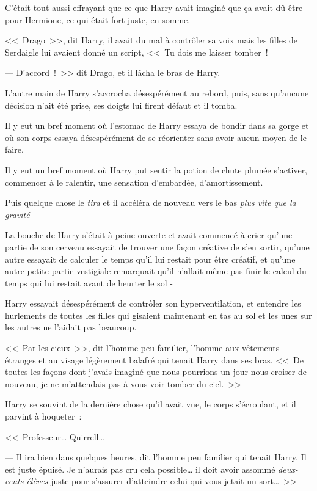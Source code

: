 C'était tout aussi effrayant que ce que Harry avait imaginé que ça avait dû être pour Hermione, ce qui était fort juste, en somme.

<<~Drago~>>, dit Harry, il avait du mal à contrôler sa voix mais les filles de Serdaigle lui avaient donné un script, <<~Tu dois me laisser tomber~!

--- D'accord~!~>> dit Drago, et il lâcha le bras de Harry.

L'autre main de Harry s'accrocha désespérément au rebord, puis, sans qu'aucune décision n'ait été prise, ses doigts lui firent défaut et il tomba.

Il y eut un bref moment où l'estomac de Harry essaya de bondir dans sa gorge et où son corps essaya désespérément de se réorienter sans avoir aucun moyen de le faire.

Il y eut un bref moment où Harry put sentir la potion de chute plumée s'activer, commencer à le ralentir, une sensation d'embardée, d'amortissement.

Puis quelque chose le \emph{tira} et il accéléra de nouveau vers le bas \emph{plus vite que la gravité} -

La bouche de Harry s'était à peine ouverte et avait commencé à crier qu'une partie de son cerveau essayait de trouver une façon créative de s'en sortir, qu'une autre essayait de calculer le temps qu'il lui restait pour être créatif, et qu'une autre petite partie vestigiale remarquait qu'il n'allait même pas finir le calcul du temps qui lui restait avant de heurter le sol -

\later

Harry essayait désespérément de contrôler son hyperventilation, et entendre les hurlements de toutes les filles qui gisaient maintenant en tas au sol et les unes sur les autres ne l'aidait pas beaucoup.

<<~Par les cieux~>>, dit l'homme peu familier, l'homme aux vêtements étranges et au visage légèrement balafré qui tenait Harry dans ses bras. <<~De toutes les façons dont j'avais imaginé que nous pourrions un jour nous croiser de nouveau, je ne m'attendais pas à vous voir tomber du ciel.~>>

Harry se souvint de la dernière chose qu'il avait vue, le corps s'écroulant, et il parvint à hoqueter~:

<<~Professeur… Quirrell…

--- Il ira bien dans quelques heures, dit l'homme peu familier qui tenait Harry. Il est juste épuisé. Je n'aurais pas cru cela possible… il doit avoir assommé \emph{deux-cents élèves} juste pour s'assurer d'atteindre celui qui vous jetait un sort…~>>

